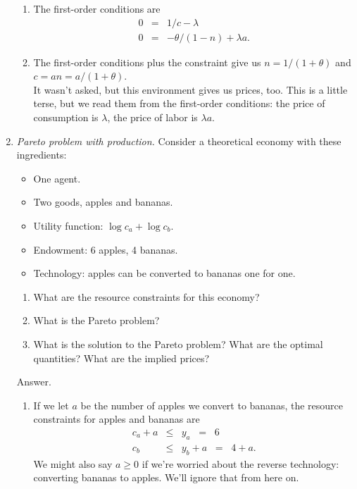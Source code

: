 \documentclass[11pt]{article}
\begin{document}
\begin{enumerate}
\begin{enumerate}
\item The first-order conditions are
\begin{eqnarray*}
    0 &=& 1/c - \lambda \\
    0 &=& - \theta/(1-n) + \lambda a .
\end{eqnarray*}
\item The first-order conditions plus the constraint give us
$ n = 1/(1+\theta) $ and $ c = an = a/(1+\theta) $.  \\
It wasn't asked, but this environment gives us prices, too.
This is a little terse, but we read them from the first-order conditions:
the price of consumption is $\lambda$, the price of labor is $\lambda a $.
\end{enumerate}

\item {\it Pareto problem with production.\/}
Consider a theoretical economy with these ingredients:
\begin{itemize}
\item One agent.
\item Two goods, apples and bananas.
\item Utility function: $ \log c_a + \log c_b $.
\item Endowment:  6 apples, 4 bananas.
\item Technology:  apples can be converted to bananas one for one.
\end{itemize}

\begin{enumerate}
\item What are the resource constraints for this economy?
\item What is the Pareto problem?
\item What is the solution to the Pareto problem?
What are the optimal quantities?  What are the implied prices?
\end{enumerate}

Answer.
\begin{enumerate}
\item If we let $a$ be the number of apples we convert to bananas,
the resource constraints for apples and bananas are
\begin{eqnarray*}
    c_a + a &\leq& y_a \;\;=\;\; 6 \\
    c_b &\leq& y_b + a \;\;=\;\; 4 + a.
\end{eqnarray*}
We might also say $ a\geq 0$ if we're worried about the reverse technology:
converting bananas to apples.
We'll ignore that from here on.


\end{enumerate}
\end{enumerate}
\end{document}
